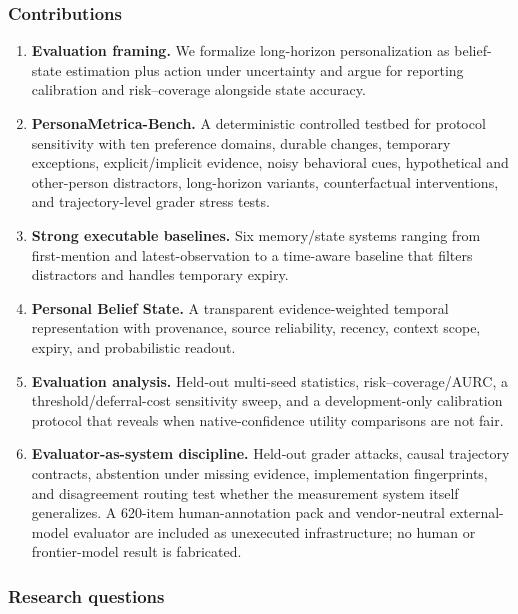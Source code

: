 \subsubsection{Contributions}\label{contributions}

\begin{enumerate}
\def\labelenumi{\arabic{enumi}.}
\tightlist
\item
  \textbf{Evaluation framing.} We formalize long-horizon personalization
  as belief-state estimation plus action under uncertainty and argue for
  reporting calibration and risk--coverage alongside state accuracy.
\item
  \textbf{PersonaMetrica-Bench.} A deterministic controlled testbed for
  protocol sensitivity with ten preference domains, durable changes,
  temporary exceptions, explicit/implicit evidence, noisy behavioral
  cues, hypothetical and other-person distractors, long-horizon
  variants, counterfactual interventions, and trajectory-level grader
  stress tests.
\item
  \textbf{Strong executable baselines.} Six memory/state systems ranging
  from first-mention and latest-observation to a time-aware baseline
  that filters distractors and handles temporary expiry.
\item
  \textbf{Personal Belief State.} A transparent evidence-weighted
  temporal representation with provenance, source reliability, recency,
  context scope, expiry, and probabilistic readout.
\item
  \textbf{Evaluation analysis.} Held-out multi-seed statistics,
  risk--coverage/AURC, a threshold/deferral-cost sensitivity sweep, and
  a development-only calibration protocol that reveals when
  native-confidence utility comparisons are not fair.
\item
  \textbf{Evaluator-as-system discipline.} Held-out grader attacks,
  causal trajectory contracts, abstention under missing evidence,
  implementation fingerprints, and disagreement routing test whether the
  measurement system itself generalizes. A 620-item human-annotation
  pack and vendor-neutral external-model evaluator are included as
  unexecuted infrastructure; no human or frontier-model result is
  fabricated.
\end{enumerate}

\subsubsection{Research questions}\label{research-questions}

